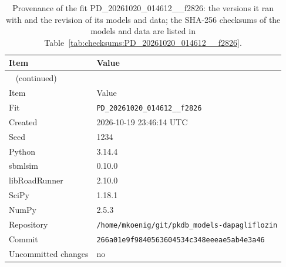 \documentclass{article}
\begin{document}
\begin{longtable}{ll}
\caption{Provenance of the fit PD\_20261020\_014612\_\_f2826: the versions it ran with and the revision of its models and data; the SHA-256 checksums of the models and data are listed in Table~\ref{tab:checksums:PD_20261020_014612__f2826}.}\label{tab:provenance:PD_20261020_014612__f2826} \\
\toprule
Item & Value \\
\midrule
\endfirsthead
\multicolumn{2}{l}{\small\tablename~\thetable{} (continued)} \\
\toprule
Item & Value \\
\midrule
\endhead
\bottomrule
\endlastfoot
Fit & \texttt{PD\_20261020\_014612\_\_f2826} \\
Created & 2026-10-19 23:46:14 UTC \\
Seed & 1234 \\
Python & 3.14.4 \\
sbmlsim & 0.10.0 \\
libRoadRunner & 2.10.0 \\
SciPy & 1.18.1 \\
NumPy & 2.5.3 \\
Repository & \texttt{/home/mkoenig/git/pkdb\_models-dapagliflozin} \\
Commit & \texttt{266a01e9f9840563604534c348eeeae5ab4e3a46} \\
Uncommitted changes & no \\
\end{longtable}



\end{document}
